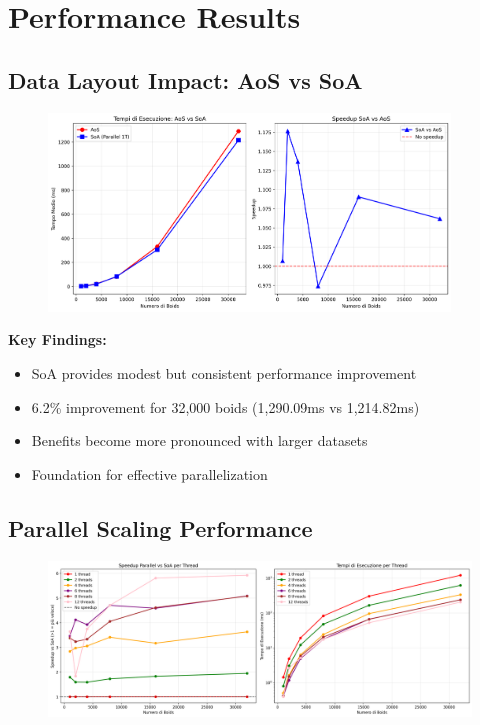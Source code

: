 \chapter{Performance Results}

\section{Data Layout Impact: AoS vs SoA}

\begin{figure}[h]
\centering
\includegraphics[width=0.95\textwidth]{../../images/aos_vs_soa.png}
\end{figure}

\textbf{Key Findings:}
\begin{itemize}
    \item SoA provides modest but consistent performance improvement
    \item 6.2\% improvement for 32,000 boids (1,290.09ms vs 1,214.82ms)
    \item Benefits become more pronounced with larger datasets
    \item Foundation for effective parallelization
\end{itemize}

\section{Parallel Scaling Performance}

\begin{figure}[h]
\centering
\includegraphics[width=1\textwidth]{../../images/parallel_analysis_performance.png}
\end{figure}

